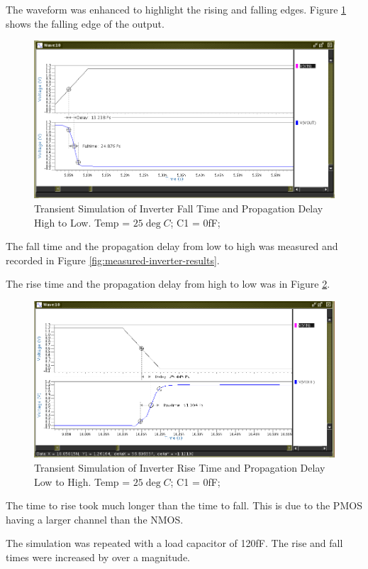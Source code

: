 \documentclass[11pt]{article}
\begin{document}
		The waveform was enhanced to highlight the rising and falling edges. Figure \ref{fig:transient-sim-nominal-no-cap} shows the falling edge of the output.
		
		\begin{figure}[H]
			\centering
			\includegraphics[width=0.7\linewidth]{"Pictures/Nominal No Cap"}
			\caption[]{Transient Simulation of Inverter Fall Time and Propagation Delay High to Low. Temp = $25\deg C$; C1 = 0fF; }
			\label{fig:transient-sim-nominal-no-cap}
		\end{figure}
	
		The fall time and the propagation delay from low to high was measured and recorded in Figure \ref{fig:measured-inverter-results}. 
		
		The rise time and the propagation delay from high to low was  in Figure \ref{fig:transient-sim-nominal-no-cap-fall}.
	
		\begin{figure}[H]
			\centering
			\includegraphics[width=0.7\linewidth]{"Pictures/Nominal No Cap Fall"}
			\caption[]{Transient Simulation of Inverter Rise Time and Propagation Delay Low to High. Temp = $25\deg C$; C1 = 0fF; }
			\label{fig:transient-sim-nominal-no-cap-fall}
		\end{figure}
	
		The time to rise took much longer than the time to fall. This is due to the PMOS having a larger channel than the NMOS.
		
		The simulation was repeated with a load capacitor of 120fF. The rise and fall times were increased by over a magnitude.  
	
\end{document}
